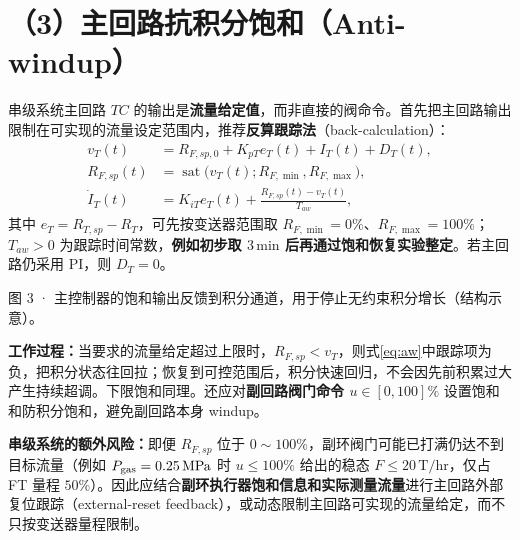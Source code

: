 \documentclass[UTF8,a4paper,11pt]{ctexart}
\newcommand{\unit}[1]{\,\mathrm{#1}}
\begin{document}
\section{（3）主回路抗积分饱和（Anti-windup）}
串级系统主回路 $TC$ 的输出是\textbf{流量给定值}，而非直接的阀命令。首先把主回路输出限制在可实现的流量设定范围内，推荐\textbf{反算跟踪法}（back-calculation）：
\begin{align}
v_T(t)&=R_{F,sp,0}+K_{pT}e_T(t)+I_T(t)+D_T(t),\\
R_{F,sp}(t)&=\operatorname{sat}\big(v_T(t);R_{F,\min},R_{F,\max}\big),\\
\dot I_T(t)&=K_{iT}e_T(t)+\frac{R_{F,sp}(t)-v_T(t)}{T_{aw}},\label{eq:aw}
\end{align}
其中 $e_T=R_{T,sp}-R_T$，可先按变送器范围取 $R_{F,\min}=0\%$、$R_{F,\max}=100\%$；$T_{aw}>0$ 为跟踪时间常数，\textbf{例如初步取 $3\unit{min}$ 后再通过饱和恢复实验整定}。若主回路仍采用 PI，则 $D_T=0$。

\begin{center}
\par\footnotesize\color{muted} 图 3 · 主控制器的饱和输出反馈到积分通道，用于停止无约束积分增长（结构示意）。\par
\end{center}

\textbf{工作过程：}当要求的流量给定超过上限时，$R_{F,sp}<v_T$，则式\eqref{eq:aw}中跟踪项为负，把积分状态往回拉；恢复到可控范围后，积分快速回归，不会因先前积累过大产生持续超调。下限饱和同理。还应对\textbf{副回路阀门命令 $u\in[0,100]\%$} 设置饱和和防积分饱和，避免副回路本身 windup。

\begin{warnbox}
\textbf{串级系统的额外风险：}即便 $R_{F,sp}$ 位于 $0\sim100\%$，副环阀门可能已打满仍达不到目标流量（例如 $P_{\rm gas}=0.25\unit{MPa}$ 时 $u\le100\%$ 给出的稳态 $F\le20\unit{T/hr}$，仅占 FT 量程 $50\%$）。因此应结合\textbf{副环执行器饱和信息和实际测量流量}进行主回路外部复位跟踪（external-reset feedback），或动态限制主回路可实现的流量给定，而不只按变送器量程限制。
\end{warnbox}
\end{document}
